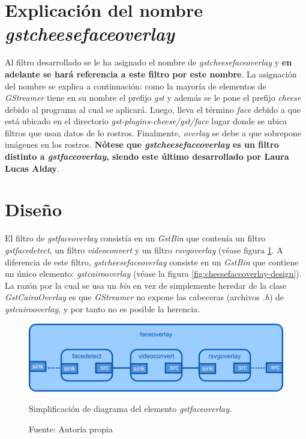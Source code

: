 \documentclass[a4paper,openright,12pt]{report}
\begin{document}
\section{Explicación del nombre \textit{gstcheesefaceoverlay}}
Al filtro desarrollado se le ha asignado el nombre de
\textit{gstcheesefaceoverlay} y \textbf{en adelante se hará referencia a este
filtro por este nombre}. La asignación del nombre se explica a continuación:
como la mayoría de elementos de \textit{GStreamer} tiene en su nombre el prefijo
\textit{gst} y además se le pone el prefijo \textit{cheese} debido al programa
al cual se aplicará. Luego, lleva el término \textit{face} debido a que está
ubicado en el directorio \textit{gst-plugins-cheese/gst/face} lugar donde se
ubica filtros que usan datos de lo rostros. Finalmente, \textit{overlay} se debe
a que sobrepone imágenes en los rostros. \textbf{Nótese que
\textit{gstcheesefaceoverlay} es un filtro distinto a \textit{gstfaceoverlay},
siendo este último desarrollado por Laura Lucas Alday}.\\

\section{Diseño}
El filtro de \textit{gstfaceoverlay} consistía en un \textit{GstBin} que
contenía un filtro \textit{gstfacedetect}, un filtro \textit{videoconvert} y
un filtro \textit{rsvgoverlay} (véase figura \ref{fig:faceoverlay-design}.
A diferencia de este filtro, \textit{gstcheesefaceoverlay} consiste en un
\textit{GstBin} que contiene un único elemento: \textit{gstcairooverlay} (véase
la figura \ref{fig:cheesefaceoverlay-design}). La razón por la cual se usa un
\textit{bin} en vez de simplemente heredar de la clase \textit{GstCairoOverlay}
es que \textit{GStreamer} no expone las cabeceras (archivos \textit{.h}) de
\textit{gstcairooverlay}, y por tanto no es posible la herencia.

\begin{figure}[!h]
  \centering
    \includegraphics[width=1.0\textwidth]{../images/faceoverlay-design.png}\par
  \caption{Simplificación de diagrama del elemento \textit{gstfaceoverlay}.}
    \label{fig:faceoverlay-design}
  \caption*{Fuente: Autoría propia}
\end{figure}
\end{document}
